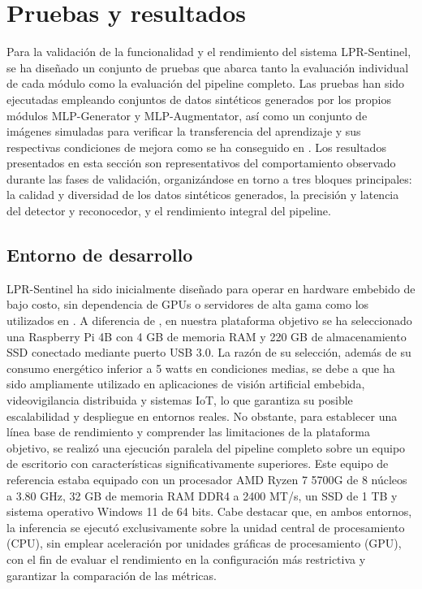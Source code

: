 \section{Pruebas y resultados}
Para la validación de la funcionalidad y el rendimiento del sistema LPR-Sentinel, se ha diseñado un conjunto de pruebas que abarca tanto la evaluación individual de cada módulo como la evaluación del pipeline completo. Las pruebas han sido ejecutadas empleando conjuntos de datos sintéticos generados por los propios módulos MLP-Generator y MLP-Augmentator, así como un conjunto de imágenes simuladas para verificar la transferencia del aprendizaje y sus respectivas condiciones de mejora como se ha conseguido en \cite{cai-liao2024}. Los resultados presentados en esta sección son representativos del comportamiento observado durante las fases de validación, organizándose en torno a tres bloques principales: la calidad y diversidad de los datos sintéticos generados, la precisión y latencia del detector y reconocedor, y el rendimiento integral del pipeline.

\subsection*{Entorno de desarrollo}
LPR-Sentinel ha sido inicialmente diseñado para operar en hardware embebido de bajo costo, sin dependencia de GPUs o servidores de alta gama como los utilizados en \cite{zhou-lu2023}. A diferencia de \cite{wang-ren2020}, en nuestra plataforma objetivo se ha seleccionado una Raspberry Pi 4B con 4 GB de memoria RAM y 220 GB de almacenamiento SSD conectado mediante puerto USB 3.0. La razón de su selección, además de su consumo energético inferior a 5 watts en condiciones medias, se debe a que ha sido ampliamente utilizado en aplicaciones de visión artificial embebida, videovigilancia distribuida y sistemas IoT, lo que garantiza su posible escalabilidad y despliegue en entornos reales. No obstante, para establecer una línea base de rendimiento y comprender las limitaciones de la plataforma objetivo, se realizó una ejecución paralela del pipeline completo sobre un equipo de escritorio con características significativamente superiores. Este equipo de referencia estaba equipado con un procesador AMD Ryzen 7 5700G de 8 núcleos a 3.80 GHz, 32 GB de memoria RAM DDR4 a 2400 MT/s, un SSD de 1 TB y sistema operativo Windows 11 de 64 bits. Cabe destacar que, en ambos entornos, la inferencia se ejecutó exclusivamente sobre la unidad central de procesamiento (CPU), sin emplear aceleración por unidades gráficas de procesamiento (GPU), con el fin de evaluar el rendimiento en la configuración más restrictiva y garantizar la comparación de las métricas.

